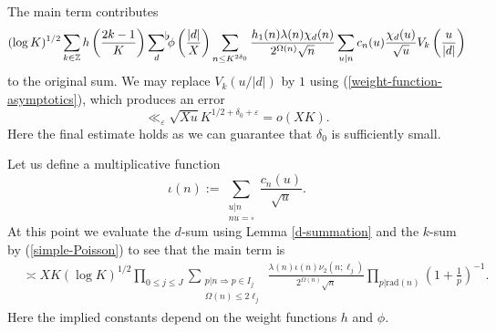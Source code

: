 \documentclass[a4paper,10pt,twoside]{amsart}
\theoremstyle{definition}
\numberwithin{equation}{section}
\newcommand\Z{\mathbb{Z}}
\newcommand\eps{\varepsilon}
\renewcommand\:{\colon}
\newcommand{\sumflat}{\mathop{{\sum}^{\raisebox{-3pt}{\makebox[0pt][l]{$\flat$}}}}}
\begin{document}
The main term contributes 
\begin{align*}
(\log K)^{1/2}\sum_{k\in\Z}h\left(\frac{2k-1}K\right)\sumflat_d \phi\left(\frac{|d|}X\right)\sum_{n\leq K^{2\delta_0}}\frac{h_1(n)\lambda(n)\chi_d(n)}{2^{\Omega(n)}\sqrt n}\sum_{u|n}c_n(u)\frac{\chi_d(u)}{\sqrt u}V_k\left(\frac u{|d|}\right)
\end{align*}
to the original sum. We may replace $V_k(u/|d|)$ by $1$ using (\ref{weight-function-asymptotics}), which produces an error
\[ 
\ll_\eps\sqrt{Xu} K^{1/2+\delta_0+\eps}=o(XK).
\]
Here the final estimate holds as we can guarantee that $\delta_0$ is sufficiently small.

Let us define a multiplicative function  
\[ 
\iota(n):=\sum_{\substack{u|n\\
nu=\square}}\frac{c_n(u)}{\sqrt u}. 
\]
At this point we evaluate the $d$-sum using Lemma \ref{d-summation} and the $k$-sum by (\ref{simple-Poisson}) to see that the main term is
\begin{align}\label{second-moment-main-term}
&\asymp XK(\log K)^{1/2}\prod_{0\leq j\leq J}\sum_{\substack{p|n\Rightarrow p\in I_j\\
\Omega(n)\leq 2\ell_j}}\frac{\lambda(n)\iota(n)\nu_2(n;\ell_j)}{2^{\Omega(n)}\sqrt n}\prod_{p|\text{rad}(n)}\left(1+\frac1p\right)^{-1}.
\end{align} 
Here the implied constants depend on the weight functions $h$ and $\phi$.
\end{document}
